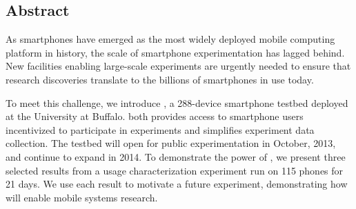\subsection*{Abstract}

As smartphones have emerged as the most widely deployed mobile computing
platform in history, the scale of smartphone experimentation has lagged
behind. New facilities enabling large-scale experiments are urgently needed
to ensure that research discoveries translate to the billions of smartphones
in use today.

To meet this challenge, we introduce \PhoneLab{}, a 288-device smartphone
testbed deployed at the University at Buffalo. \PhoneLab{} both provides
access to smartphone users incentivized to participate in experiments and
simplifies experiment data collection. The testbed will open for public
experimentation in October, 2013, and continue to expand in 2014. To
demonstrate the power of \PhoneLab{}, we present three selected results from
a usage characterization experiment run on 115 phones for 21 days. We use
each result to motivate a future \PhoneLab{} experiment, demonstrating how
\PhoneLab{} will enable mobile systems research.
